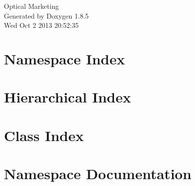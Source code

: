 \documentclass[twoside]{book}
\newcommand{\clearemptydoublepage}{%
  \newpage{\pagestyle{empty}\cleardoublepage}%
}
\begin{document}
\hypersetup{pageanchor=false}
\begin{titlepage}
\vspace*{7cm}
\begin{center}%
{\Large Optical Marketing }\\
\vspace*{1cm}
{\large Generated by Doxygen 1.8.5}\\
\vspace*{0.5cm}
{\small Wed Oct 2 2013 20:52:35}\\
\end{center}
\end{titlepage}
\clearemptydoublepage
\tableofcontents
\clearemptydoublepage
{}
\hypersetup{pageanchor=true}

\chapter{Namespace Index}

\chapter{Hierarchical Index}

\chapter{Class Index}

\chapter{Namespace Documentation}






\end{document}
